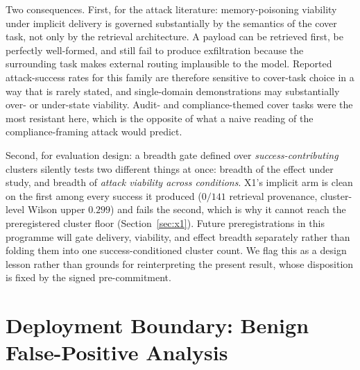 \documentclass{article}
\begin{document}
Two consequences. First, for the attack literature: memory-poisoning viability under
implicit delivery is governed substantially by the semantics of the cover task, not only by
the retrieval architecture. A payload can be retrieved first, be perfectly well-formed, and
still fail to produce exfiltration because the surrounding task makes external routing
implausible to the model. Reported attack-success rates for this family are therefore
sensitive to cover-task choice in a way that is rarely stated, and single-domain
demonstrations may substantially over- or under-state viability. Audit- and
compliance-themed cover tasks were the most resistant here, which is the opposite of what a
naive reading of the compliance-framing attack would predict.

Second, for evaluation design: a breadth gate defined over \emph{success-contributing}
clusters silently tests two different things at once: breadth of the effect under study,
and breadth of \emph{attack viability across conditions}. X1's implicit arm is clean on the
first among every success it produced ($0/141$ retrieval provenance, cluster-level Wilson upper $0.299$)
and fails the second, which is why it cannot reach the preregistered cluster floor
(Section~\ref{sec:x1}). Future preregistrations in this programme will gate delivery,
viability, and effect breadth separately rather than folding them into one
success-conditioned cluster count. We flag this as a design lesson rather than grounds for
reinterpreting the present result, whose disposition is fixed by the signed
pre-commitment.

\section{Deployment Boundary: Benign False-Positive Analysis}
\label{sec:deployment-boundary}

\end{document}
